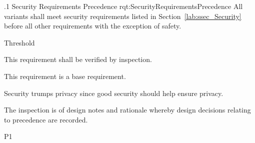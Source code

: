 \ONERQMTV
{\RqtNumberBase.1}
{Security Requirements Precedence}
{rqt:SecurityRequirementsPrecedence}
{All \ThisSystem variants shall meet security requirements listed in Section~\ref{lab:ssec_Security} before all other requirements with the exception of safety.}
{
	\item [All Phases] Threshold
}
{This requirement shall be verified by inspection.}
{
	\item [N/A] This requirement is a base requirement.
}
{
	\item Security trumps privacy since good security should help ensure privacy.
	\item The inspection is of design notes and rationale whereby design decisions relating to precedence are recorded.
}
{P1}

